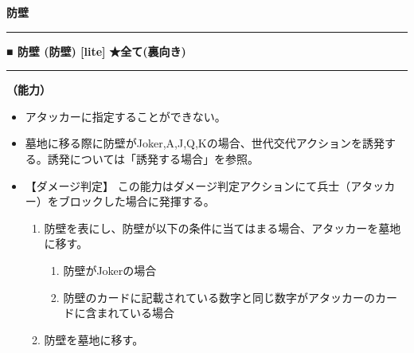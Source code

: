 \documentclass[twocolumn,a5paper,papersize,10pt]{jarticle}
\begin{document}
\begin{tcolorbox}
{\scriptsize\bf 防壁}
\end{tcolorbox}
\vspace{-1zh}%
\vspace{2mm} %
\hrule height 0.5mm depth 0mm width 66.5mm %
\vspace{1mm} %
{\normalsize\bf ■ 防壁 {\scriptsize (防壁) [lite]}} %
\hfill 
{\small\bf ★全て(裏向き) }

\vspace{1mm}%
\hrule height 0.1mm depth 0mm width 66.5mm %
\vspace{1mm}%

{\bf（能力）}


\vspace{-1zh}%
\begin{itemize}
\setlength{\leftskip}{-0.3cm}
\setlength{\parskip}{0pt} %

\item アタッカーに指定することができない。

\item 墓地に移る際に防壁がJoker,A,J,Q,Kの場合、世代交代アクションを誘発する。誘発については「誘発する場合」を参照。

\item 【ダメージ判定】 この能力はダメージ判定アクションにて兵士（アタッカー）をブロックした場合に発揮する。

\vspace{-1zh}%
\begin{enumerate}
\setlength{\leftskip}{-0.3cm}
\setlength{\parskip}{0pt} %

\item 防壁を表にし、防壁が以下の条件に当てはまる場合、アタッカーを墓地に移す。

\begin{enumerate}
\renewcommand{\labelenumi}{\Alph{enumi}}
\setlength{\leftskip}{-0.3cm}
\setlength{\parskip}{0pt} %

\item 防壁がJokerの場合

\item 防壁のカードに記載されている数字と同じ数字がアタッカーのカードに含まれている場合

\end{enumerate}
\item 防壁を墓地に移す。
\vspace{-1zh}%
\end{enumerate}\vspace{-1zh}%
\end{itemize}
\end{document}

